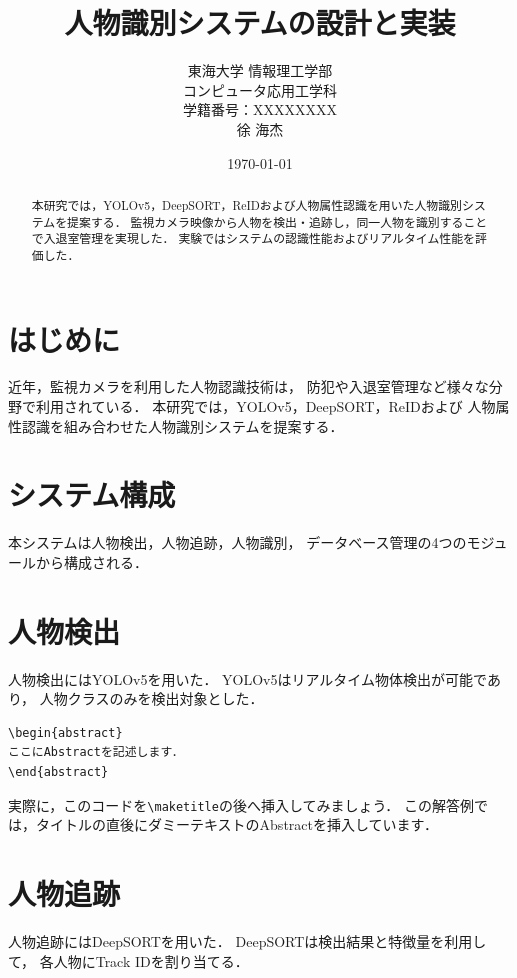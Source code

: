 \documentclass[a4paper,twocolumn]{jsarticle}
\title{人物識別システムの設計と実装}
\author{東海大学 情報理工学部\\
コンピュータ応用工学科\\
学籍番号：XXXXXXXX\\
徐 海杰}
\date{\today}
\begin{document}
\maketitle

\begin{abstract}
本研究では，YOLOv5，DeepSORT，ReIDおよび人物属性認識を用いた人物識別システムを提案する．
監視カメラ映像から人物を検出・追跡し，同一人物を識別することで入退室管理を実現した．
実験ではシステムの認識性能およびリアルタイム性能を評価した．
\end{abstract}

\section{はじめに}
近年，監視カメラを利用した人物認識技術は，
防犯や入退室管理など様々な分野で利用されている．
本研究では，YOLOv5，DeepSORT，ReIDおよび
人物属性認識を組み合わせた人物識別システムを提案する．

\section{システム構成}
本システムは人物検出，人物追跡，人物識別，
データベース管理の4つのモジュールから構成される．

\section{人物検出}
人物検出にはYOLOv5を用いた．
YOLOv5はリアルタイム物体検出が可能であり，
人物クラスのみを検出対象とした．

\begin{verbatim}
\begin{abstract}
ここにAbstractを記述します．
\end{abstract}
\end{verbatim}

実際に，このコードを\verb|\maketitle|の後へ挿入してみましょう．
この解答例では，タイトルの直後にダミーテキストのAbstractを挿入しています．


\section{人物追跡}
人物追跡にはDeepSORTを用いた．
DeepSORTは検出結果と特徴量を利用して，
各人物にTrack IDを割り当てる．
\end{document}
